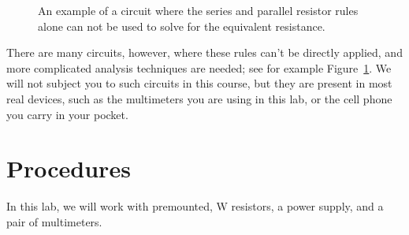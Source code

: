 \documentclass[12pt]{article}
\begin{document}
\begin{figure}
  \centering
  
  \caption{An example of a circuit where the series and parallel
    resistor rules alone can not be used to solve for the equivalent
    resistance.}
  \label{fig:bridgecircuit}
\end{figure}
There are many circuits, however, where these rules can't be directly
applied, and more complicated analysis techniques are needed; see for
example Figure~\ref{fig:bridgecircuit}.  We will not subject you to
such circuits in this course, but they are present in most real
devices, such as the multimeters you are using in this lab, or the
cell phone you carry in your pocket.

\section{Procedures}
\label{sec:procedures}

In this lab, we will work with premounted, \unit[1]{W} resistors, a
power supply, and a pair of multimeters.  
\end{document}
